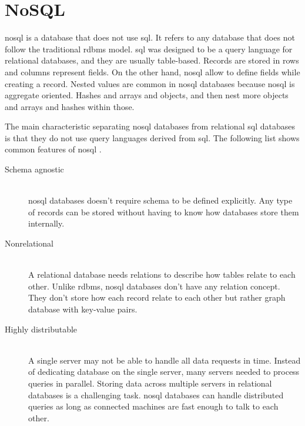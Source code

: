 \section{NoSQL}
\gls{nosql} is a database that does not use \gls{sql}.
It refers to any database that does not follow the traditional \gls{rdbms} model.
\gls{sql} was designed to be a query language for relational databases, and they are usually table-based.
Records are stored in rows and columns represent fields.
On the other hand, \gls{nosql} allow to define fields while creating a record.
Nested values are common in \gls{nosql} databases because \gls{nosql} is aggregate oriented.
Hashes and arrays and objects, and then nest more objects and arrays and hashes within those.

The main characteristic separating \gls{nosql} databases from relational \gls{sql} databases is that they do not use query languages derived from \gls{sql}. 
The following list shows common features of \gls{nosql} \cite[p.~12 - 16]{nosql-for-dummies}.
\begin{description}
	\item[Schema agnostic] \hfill \\
	\gls{nosql} databases doesn't require schema to be defined explicitly.
	Any type of records can be stored without having to know how databases store them internally.
	\item[Nonrelational] \hfill \\
	A relational database needs relations to describe how tables relate to each other.
	Unlike \gls{rdbms}, \gls{nosql} databases don't have any relation concept.
	They don't store how each record relate to each other but rather graph database with key-value pairs.
	\item[Highly distributable] \hfill \\
	A single server may not be able to handle all data requests in time.
	Instead of dedicating database on the single server, many servers needed to process queries in parallel.
	Storing data across multiple servers in relational databases is a challenging task.
	\gls{nosql} databases can handle distributed queries as long as connected machines are fast enough to talk to each other.
\end{description}

